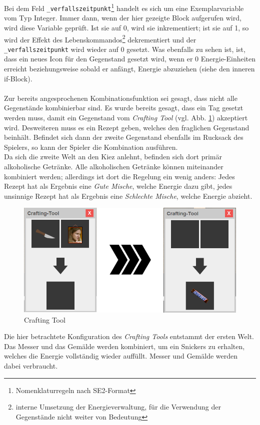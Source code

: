 \documentclass[12pt,twoside]{article}
\theoremstyle{plain}
\theoremstyle{definition}
\theoremstyle{remark}
\begin{document}
Bei dem Feld \texttt{\_verfallszeitpunkt}\footnote{Nomenklaturregeln nach SE2-Format} handelt es sich um eine Exemplarvariable vom Typ Integer.
Immer dann, wenn der hier gezeigte Block aufgerufen wird, wird diese Variable geprüft.
Ist sie auf 0, wird sie inkrementiert; ist sie auf 1, so wird der Effekt des Lebenskommandos\footnote{interne Umsetzung der Energieverwaltung, für die Verwendung der Gegenstände nicht weiter von Bedeutung} dekrementiert und der \texttt{\_verfallszeitpunkt} wird wieder auf 0 gesetzt.
Was ebenfalls zu sehen ist, ist, dass ein neues Icon für den Gegenstand gesetzt wird, wenn er 0 Energie-Einheiten erreicht beziehungsweise sobald er anfängt, Energie abzuziehen (siehe den inneren if-Block).\\
\\
Zur bereits angesprochenen Kombinationsfunktion sei gesagt, dass nicht alle Gegenstände kombinierbar sind.
Es wurde bereits gesagt, dass ein Tag gesetzt werden muss, damit ein Gegenstand vom \textit{Crafting Tool} (vgl. Abb. \ref{fig:main_craft}) akzeptiert wird.
Desweiteren muss es ein Rezept geben, welches den fraglichen Gegenstand beinhält.
Befindet sich dann der zweite Gegenstand ebenfalls im Rucksack des Spielers, so kann der Spieler die Kombination ausführen.\\
Da sich die zweite Welt an den Kiez anlehnt, befinden sich dort primär alkoholische Getränke.
Alle alkoholischen Getränke können miteinander kombiniert werden; allerdings ist dort die Regelung ein wenig anders: Jedes Rezept hat als Ergebnis eine \textit{Gute Mische}, welche Energie dazu gibt, jedes unsinnige Rezept hat als Ergebnis eine \textit{Schlechte Mische}, welche Energie abzieht.
\begin{figure}[h!bt]
    \begin{center}
        \includegraphics[scale=0.5]{craftingUI.png}
    	\caption{Crafting Tool}
        \label{fig:main_craft}
    \end{center}
\end{figure}
Die hier betrachtete Konfiguration des \textit{Crafting Tools} entstammt der ersten Welt.
Das Messer und das Gemälde werden kombiniert, um ein Snickers zu erhalten, welches die Energie vollständig wieder auffüllt.
Messer und Gemälde werden dabei verbraucht.
\end{document}
